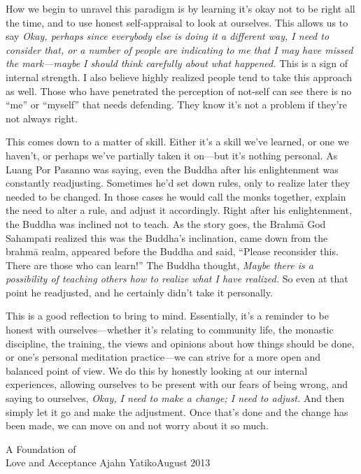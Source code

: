 How we begin to unravel this paradigm is by learning it's okay not to 
be right all the time, and to use honest self-appraisal to look at 
ourselves. This allows us to say \emph{Okay, perhaps since everybody 
else is doing it a different way, I need to consider that, or a number 
of people are indicating to me that I may have missed the mark---maybe 
I should think carefully about what happened.} This is a sign of 
internal strength. I also believe highly realized people tend to take 
this approach as well. Those who have penetrated the perception of 
not-self can see there is no ``me'' or ``myself'' that needs defending. 
They know it's not a problem if they're not always right.

This comes down to a matter of skill. Either it's a skill we've 
learned, or one we haven't, or perhaps we've partially taken it 
on---but it's nothing personal. As Luang Por Pasanno was saying, even 
the Buddha after his enlightenment was constantly readjusting. 
Sometimes he'd set down rules, only to realize later they needed to be 
changed. In those cases he would call the monks together, explain the 
need to alter a rule, and adjust it accordingly. Right after his 
enlightenment, the Buddha was inclined not to teach. As the story goes, 
the Brahmā God Sahampati realized this was the Buddha's inclination, 
came down from the brahmā realm, appeared before the Buddha and said, 
``Please reconsider this. There are those who can learn!'' The Buddha 
thought, \emph{Maybe there is a possibility of teaching others how to 
realize what I have realized.} So even at that point he readjusted, and 
he certainly didn't take it personally.

This is a good reflection to bring to mind. Essentially, it's a 
reminder to be honest with ourselves---whether it's relating to 
community life, the monastic discipline, the training, the views and 
opinions about how things should be done, or one's personal meditation 
practice---we can strive for a more open and balanced point of view. We 
do this by honestly looking at our internal experiences, allowing 
ourselves to be present with our fears of being wrong, and saying to 
ourselves, \emph{Okay, I need to make a change; I need to adjust.} And 
then simply let it go and make the adjustment. Once that's done and the 
change has been made, we can move on and not worry about it so much.

{A Foundation of\\Love and Acceptance}
{Ajahn Yatiko}{August 2013}

